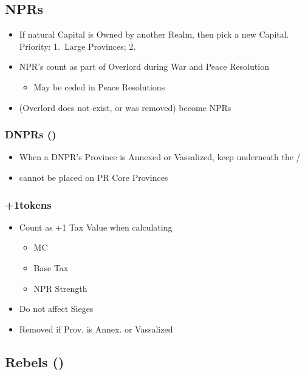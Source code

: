\documentclass[10pt]{article}
\begin{document}
\subsection*{NPRs }
\begin{itemize}
	\item If natural Capital is Owned by another Realm, then pick a new Capital. Priority: 1.~Large Provinces; 2.~\az
	\item NPR's  count as part of Overlord during War and Peace Resolution
	\begin{itemize}
		\item May be ceded in Peace Resolutions
	\end{itemize}
	\item {} (Overlord does not exist, or \vassal was removed) become NPRs
\end{itemize}

\subsubsection*{DNPRs (\dnpr) }
\begin{itemize}
	\item When a DNPR's Province is Annexed or Vassalized, keep \dnpr underneath the \town/\vassal 
	\item \dnpr cannot be placed on PR Core Provinces
\end{itemize}

\subsubsection*{+1\manpower tokens }
\begin{itemize}
	\item Count as +1 Tax Value when calculating
	\begin{itemize}
		\item MC
		\item Base Tax
		\item NPR Strength
	\end{itemize}
	\item Do not affect Sieges
	\item Removed if Prov. is Annex. or Vassalized
\end{itemize}

\subsection*{Rebels (\rebel) }
\end{document}
